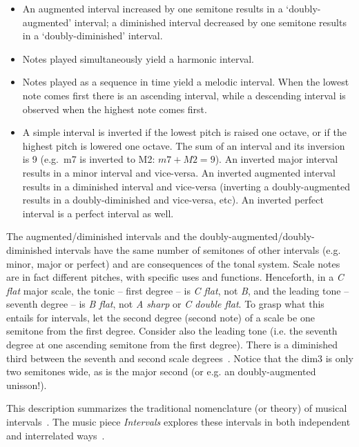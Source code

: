 \begin{itemize}
	\item An augmented interval increased by one semitone results in a `doubly-augmented' interval; a diminished interval decreased by one semitone results in a `doubly-diminished' interval.
	\item Notes played simultaneously yield a harmonic interval.
	\item Notes played as a sequence in time yield a
                melodic interval.  When the lowest note comes first there is an ascending interval, while a descending interval is observed when the highest note comes first. 
	\item A simple interval is inverted if the lowest pitch is raised one octave, or if
                the highest pitch is lowered one octave. The sum of an interval and its inversion is
                9 (e.g.\ m7 is inverted to M2: $m7+M2=9$). An inverted major
                interval results in a minor interval and vice-versa. An
                inverted augmented interval results in a diminished interval
                and vice-versa (inverting a doubly-augmented results in a
                doubly-diminished and vice-versa, etc).
                An inverted perfect interval is a perfect interval as well.
\end{itemize}

The augmented/diminished intervals and the doubly-augmented/doubly-diminished intervals have the same number of semitones of other intervals (e.g. minor, major or perfect) and are consequences of the tonal system.
Scale notes are in fact different pitches, with specific uses and functions. Henceforth, in a \textit{C flat} major scale, the tonic -- first degree -- is \textit{C flat}, not \textit{B}, and the leading tone -- seventh degree -- is \textit{B flat}, not \textit{A sharp} or \textit{C double flat}.
To grasp what this entails for intervals, let the second degree (second note) of a scale be one semitone from the first degree. Consider also the leading tone (i.e. the seventh degree at one ascending semitone from the first degree). There is a diminished third between the seventh and second scale degrees~\cite{Lacerda}.
Notice that the dim3 is only two semitones wide, as is the major second (or e.g. an doubly-augmented unisson!).

This description summarizes the traditional nomenclature (or theory) of musical intervals~\cite{Lacerda}.
The music piece \emph{Intervals} explores these intervals in both independent and interrelated ways~\cite{MASSA}.

